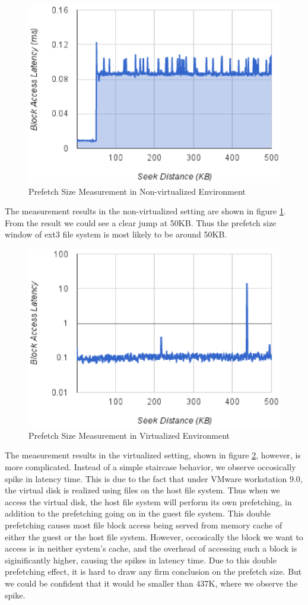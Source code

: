 \begin{figure}
\centering
\includegraphics[width=.65\textwidth]{figures/prefetch_1.eps}
\caption{Prefetch Size Measurement in Non-virtualized Environment}
\label{fig:prefetch_1}
\end{figure}

The measurement results in the non-virtualized setting are shown in figure \ref{fig:prefetch_1}. From the result we could see a clear jump at 50KB. Thus the prefetch size window of ext3 file system is most likely to be around 50KB.

\begin{figure}
\centering
\includegraphics[width=.65\textwidth]{figures/prefetch_2.eps}
\caption{Prefetch Size Measurement in Virtualized Environment}
\label{fig:prefetch_2}
\end{figure}

The measurement results in the virtualized setting, shown in figure \ref{fig:prefetch_2}, however, is more complicated. Instead of a simple staircase behavior, we observe occosically spike in latency time. This is due to the fact that under VMware workstation 9.0, the virtual disk is realized using files on the host file system. Thus when we access the virtual disk, the host file system will perform its own prefetching, in addition to the prefetching going on in the guest file system. This double prefetching causes most file block access being served from memory cache of either the guest or the host file system. However, occosically the block we want to access is in neither system's cache, and the overhead of accessing such a block is siginificantly higher, causing the spikes in latency time. Due to this double prefetching effect, it is hard to draw any firm conclusion on the prefetch size. But we could be confident that it would be smaller than 437K, where we observe the spike. 



